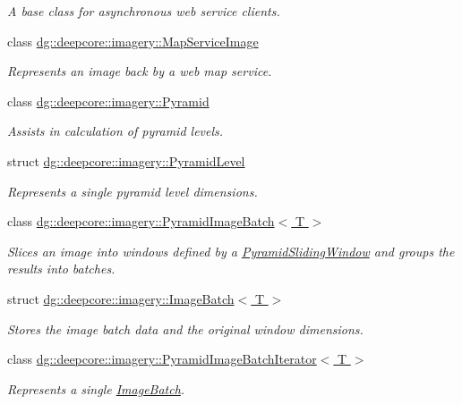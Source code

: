 \begin{DoxyCompactItemize}
\begin{DoxyCompactList}\small\item\em A base class for asynchronous web service clients. \end{DoxyCompactList}\item 
class \hyperlink{classdg_1_1deepcore_1_1imagery_1_1_map_service_image}{dg\+::deepcore\+::imagery\+::\+Map\+Service\+Image}
\begin{DoxyCompactList}\small\item\em Represents an image back by a web map service. \end{DoxyCompactList}\item 
class \hyperlink{classdg_1_1deepcore_1_1imagery_1_1_pyramid}{dg\+::deepcore\+::imagery\+::\+Pyramid}
\begin{DoxyCompactList}\small\item\em Assists in calculation of pyramid levels. \end{DoxyCompactList}\item 
struct \hyperlink{structdg_1_1deepcore_1_1imagery_1_1_pyramid_level}{dg\+::deepcore\+::imagery\+::\+Pyramid\+Level}
\begin{DoxyCompactList}\small\item\em Represents a single pyramid level dimensions. \end{DoxyCompactList}\item 
class \hyperlink{classdg_1_1deepcore_1_1imagery_1_1_pyramid_image_batch}{dg\+::deepcore\+::imagery\+::\+Pyramid\+Image\+Batch$<$ T $>$}
\begin{DoxyCompactList}\small\item\em Slices an image into windows defined by a \hyperlink{classdg_1_1deepcore_1_1imagery_1_1_pyramid_sliding_window}{Pyramid\+Sliding\+Window} and groups the results into batches. \end{DoxyCompactList}\item 
struct \hyperlink{classdg_1_1deepcore_1_1imagery_1_1_image_batch}{dg\+::deepcore\+::imagery\+::\+Image\+Batch$<$ T $>$}
\begin{DoxyCompactList}\small\item\em Stores the image batch data and the original window dimensions. \end{DoxyCompactList}\item 
class \hyperlink{classdg_1_1deepcore_1_1imagery_1_1_pyramid_image_batch_iterator}{dg\+::deepcore\+::imagery\+::\+Pyramid\+Image\+Batch\+Iterator$<$ T $>$}
\begin{DoxyCompactList}\small\item\em Represents a single \hyperlink{classdg_1_1deepcore_1_1imagery_1_1_image_batch}{Image\+Batch}. \end{DoxyCompactList}\item 

\end{DoxyCompactItemize}

